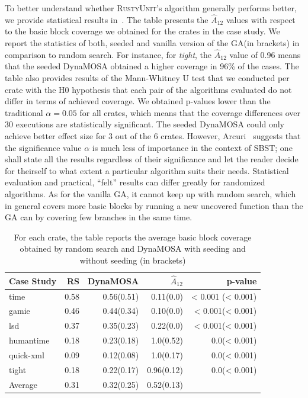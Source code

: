 \documentclass[paper=a4,%
  twoside,%
  BCOR4mm,%
  abstract=true,%
  toc=bibliography,%
  chapterprefix=true,%
  toc=bibliographynumbered,%
  open=right,%
  english,%
  pagesize=pdftex]{scrreprt}
\newcommand{\benchnum}{6\xspace}
\newcommand{\tech}{\textsc{RustyUnit}\xspace}
\newcommand{\runs}{30\xspace}
\newcommand{\ga}{\ac{GA}\xspace}
\begin{document}
To better understand whether \tech's algorithm generally performs better, we provide statistical results in~. The table presents the $\hat{A}_{12}$ values with respect to the basic block coverage we obtained for the crates in the case study. We report the statistics of both, seeded and vanilla version of the \ga (in brackets) in comparison to random search. For instance, for \emph{tight}, the $\hat{A}_{12}$ value of 0.96 means that the seeded DynaMOSA obtained a higher coverage in 96\% of the cases. The table also provides results of the Mann-Whitney U test that we conducted per crate with the H0 hypothesis that each pair of the algorithms evaluated do not differ in terms of achieved coverage. We obtained p-values lower than the traditional $\alpha = 0.05$ for all crates, which means that the coverage differences over \runs executions are statistically significant. The seeded DynaMOSA could only achieve better effect size for 3 out of the \benchnum crates. However, Arcuri~\cite{Arcuri2011} suggests that the significance value $\alpha$ is much less of importance in the context of \ac{SBST}; one shall state all the results regardless of their significance and let the reader decide for theirself to what extent a particular algorithm suits their needs. Statistical evaluation and practical, ``felt'' results can differ greatly for randomized algorithms. As for the vanilla \ga, it cannot keep up with random search, which in general covers more basic blocks by running a new uncovered function than the \ga can by covering few branches in the same time.

\begin{table}[]
\begin{tabular*}{\textwidth}{l @{\extracolsep{\fill}} rrrr}
\hline
\textbf{Case Study} & RS & DynaMOSA & \textbf{$\hat{A}_{12}$} & p-value \\
\hline
time & 0.58 & 0.56(0.51) & 0.11(0.0) & < 0.001 (< 0.001) \\
gamie & 0.46 & 0.44(0.34) & 0.10(0.0) & < 0.001(< 0.001) \\
lsd & 0.37 & 0.35(0.23) & 0.22(0.0) & < 0.001(< 0.001) \\
humantime & 0.18 & 0.23(0.18) & 1.0(0.52) & 0.0(< 0.001) \\
quick-xml & 0.09 & 0.12(0.08) & 1.0(0.17) & 0.0(< 0.001) \\
tight & 0.18 & 0.22(0.17) & 0.96(0.12) & 0.0(< 0.001) \\
\hline
Average & 0.31 & 0.32(0.25) & 0.52(0.13) &  \\
\hline
\end{tabular*}
\caption{\label{tab:coverage-table}For each crate, the table reports the average basic block coverage obtained by random search and DynaMOSA with seeding and without seeding (in brackets)}
\end{table}
\end{document}

